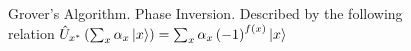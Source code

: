 \begin{figure}
\centering



\caption{Grover's Algorithm. Phase Inversion. Described by the following relation $\hat{U}_{x^{\ast}}\left(\sum_x \alpha_x \ket{x}\right) =  
\sum_x \alpha_x \left(-1\right)^{f\left(x\right)}\ket{x}$}
\label{figQuantCompGroverInv}
\end{figure}
